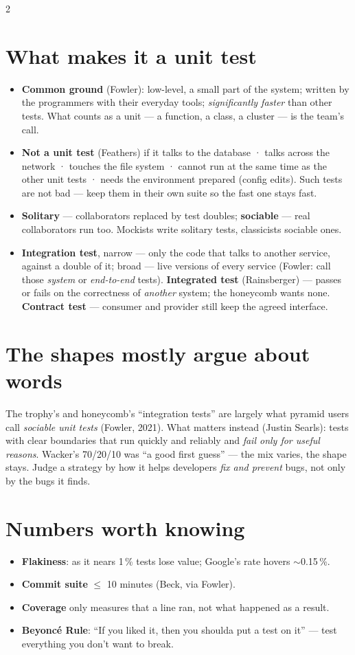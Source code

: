 \documentclass[8pt]{extarticle}
\begin{document}
\begin{multicols}{2}
\section{What makes it a unit test}
\begin{itemize}
  \item \textbf{Common ground} (Fowler): low-level, a small part of the system; written by the
        programmers with their everyday tools; \emph{significantly faster} than other tests.
        What counts as a unit — a function, a class, a cluster — is the team's call.
  \item \textbf{Not a unit test} (Feathers) if it talks to the database · talks across the network ·
        touches the file system · cannot run at the same time as the other unit tests · needs
        the environment prepared (config edits). Such tests are not bad — keep them in their
        own suite so the fast one stays fast.
  \item \textbf{Solitary} — collaborators replaced by test doubles; \textbf{sociable} —
        real collaborators run too. Mockists write solitary tests, classicists sociable ones.
  \item \textbf{Integration test}, narrow — only the code that talks to another service,
        against a double of it; broad — live versions of every service (Fowler: call those
        \emph{system} or \emph{end-to-end} tests). \textbf{Integrated test} (Rainsberger) —
        passes or fails on the correctness of \emph{another} system; the honeycomb wants none.
        \textbf{Contract test} — consumer and provider still keep the agreed interface.
\end{itemize}

\section{The shapes mostly argue about words}
The trophy's and honeycomb's ``integration tests'' are largely what pyramid users call
\emph{sociable unit tests} (Fowler, 2021). What matters instead (Justin Searls): tests with clear
boundaries that run quickly and reliably and \emph{fail only for useful reasons}. Wacker's 70/20/10
was ``a good first guess'' — the mix varies, the shape stays. Judge a strategy by how it helps
developers \emph{fix and prevent} bugs, not only by the bugs it finds.

\section{Numbers worth knowing}
\begin{itemize}
  \item \textbf{Flakiness}: as it nears 1\,\% tests lose value; Google's rate hovers $\sim$0.15\,\%.
  \item \textbf{Commit suite} $\le$ 10 minutes (Beck, via Fowler).
  \item \textbf{Coverage} only measures that a line ran, not what happened as a result.
  \item \textbf{Beyoncé Rule}: ``If you liked it, then you shoulda put a test on it'' — test
        everything you don't want to break.
\end{itemize}


\end{multicols}
\end{document}

